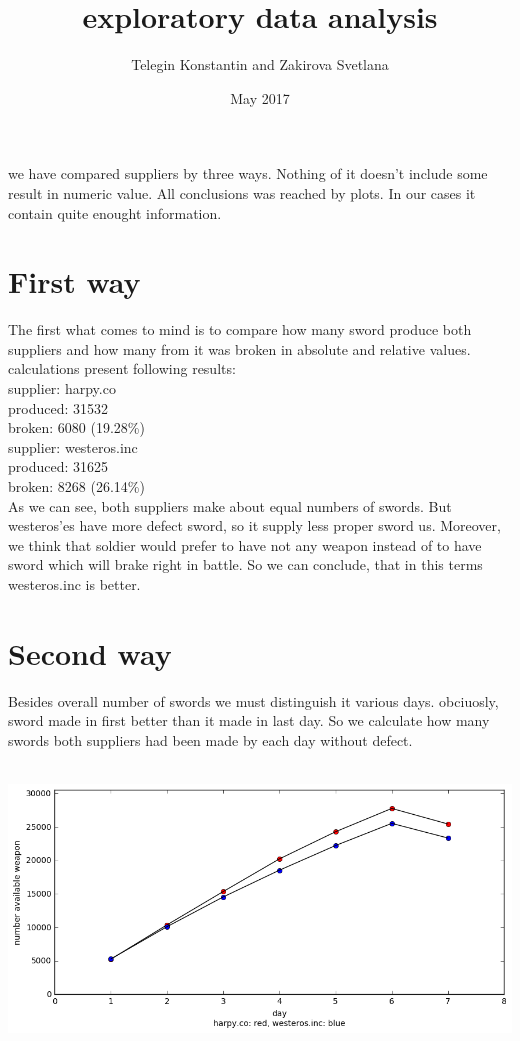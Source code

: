 \documentclass{article}
\title{exploratory data analysis}
\author{Telegin Konstantin and Zakirova Svetlana}
\date{May 2017}
\begin{document}
	\maketitle
		
	we have compared suppliers by three ways. Nothing of it doesn't include some result in numeric value. All conclusions was reached by plots. In our cases it contain quite enought information. 

	
	\section{First way}
The first what comes to mind is to compare how many sword produce both suppliers and how many from it was broken in absolute and relative values.\\
	calculations present following results:\\

supplier: harpy.co\\
   produced: 31532\\
   broken: 6080 (19.28\%)\\

supplier: westeros.inc\\
   produced: 31625\\
   broken: 8268 (26.14\%)\\
	
	As we can see, both suppliers make about equal numbers of swords. But westeros'es have more defect sword, so it supply less proper sword us. Moreover, we think that soldier would prefer to have not any weapon instead of to have sword which will brake right in battle. So we can conclude, that in this terms westeros.inc is better.
	\
	
	\section{Second way}
	
	Besides overall number of swords we must distinguish it various days. obciuosly, sword made in first better than it made in last day. So we calculate how many swords both suppliers had been made by each day without defect. 
   
   \hbox{\hspace{-5em} \includegraphics[scale=0.7]{daily_analyze}}
\end{document}
